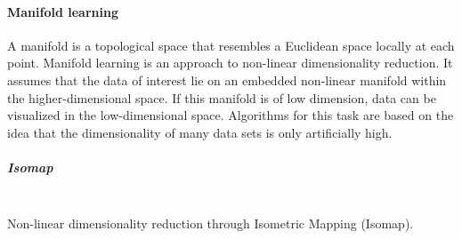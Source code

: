\paragraph{Manifold learning}
\label{paragraph:Manifold}
A manifold is a topological space that resembles a Euclidean space locally at each point. Manifold
learning is an approach to non-linear dimensionality reduction. It assumes that the data of interest
 lie on an embedded non-linear manifold within the higher-dimensional space. If this manifold is of
 low dimension, data can be visualized in the low-dimensional space. Algorithms for this task are
based on the idea that the dimensionality of many data sets is only artificially high.
\subparagraph{Isomap} \hfil \\
\label{subparagraph:Isomap}
Non-linear dimensionality reduction through Isometric Mapping (Isomap).
